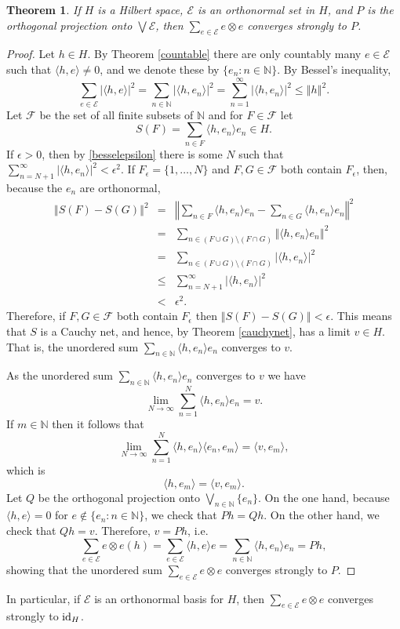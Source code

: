 \documentclass{article}
\newcommand{\inner}[2]{\langle #1, #2 \rangle}
\newcommand{\id}{\ensuremath\mathrm{id}}
\newcommand{\norm}[1]{\left\Vert #1 \right\Vert}
\newtheorem{theorem}{Theorem}
\begin{document}
\begin{theorem}
If $H$ is a Hilbert space, $\mathscr{E}$ is an orthonormal set in $H$, and $P$ is the orthogonal projection
onto $\bigvee \mathscr{E}$, then $\sum_{e \in \mathscr{E}} e \otimes e$ converges strongly to $P$.
\end{theorem}
\begin{proof}
Let $h \in H$. By Theorem \ref{countable} there are only countably many $e \in \mathscr{E}$ such that $\inner{h}{e} \neq 0$, and we denote
these by $\{e_n: n \in \mathbb{N}\}$. By Bessel's inequality,
\begin{equation}
\sum_{e \in \mathscr{E}} |\inner{h}{e}|^2 = \sum_{n \in \mathbb{N}} |\inner{h}{e_n}|^2 = \sum_{n=1}^\infty |\inner{h}{e_n}|^2 \leq 
\norm{h}^2.
\label{besselepsilon}
\end{equation}
Let $\mathscr{F}$ be the set of all finite subsets of $\mathbb{N}$ and for $F \in \mathscr{F}$ let
\[
S(F)=\sum_{n \in F} \inner{h}{e_n}e_n \in H.
\]
If $\epsilon>0$, then by \eqref{besselepsilon} there is some $N$ such that $\sum_{n=N+1}^\infty |\inner{h}{e_n}|^2<\epsilon^2$. If
$F_\epsilon=\{1,\ldots,N\}$ and $F,G \in \mathscr{F}$ both contain $F_\epsilon$, then, because the $e_n$ are orthonormal,
\begin{eqnarray*}
\norm{S(F)-S(G)}^2&=&\norm{\sum_{n \in F} \inner{h}{e_n}e_n - \sum_{n \in G} \inner{h}{e_n}e_n}^2\\
&=&\sum_{n \in (F \cup G) \setminus (F \cap G)} \norm{\inner{h}{e_n}e_n}^2\\
&=&\sum_{n \in (F \cup G) \setminus (F \cap G)} |\inner{h}{e_n}|^2\\
&\leq&\sum_{n=N+1}^\infty  |\inner{h}{e_n}|^2\\
&<&\epsilon^2.
\end{eqnarray*}
Therefore, if $F,G \in \mathscr{F}$ both contain $F_\epsilon$ then $\norm{S(F)-S(G)} < \epsilon$. This means that $S$ is a Cauchy net, and hence, by Theorem \ref{cauchynet},
has a limit $v \in H$. That is, the unordered sum $\sum_{n \in \mathbb{N}} \inner{h}{e_n}e_n$ converges to $v$.

As the unordered sum $\sum_{n \in \mathbb{N}} \inner{h}{e_n}e_n$ converges to $v$ we have
\[
\lim_{N \to \infty} \sum_{n=1}^N \inner{h}{e_n}e_n = v.
\]
If $m \in \mathbb{N}$ then it follows that 
\[
\lim_{N \to \infty} \sum_{n=1}^N \inner{h}{e_n}\inner{e_n}{e_m} = \inner{v}{e_m},
\]
which is
\[
\inner{h}{e_m}=\inner{v}{e_m}.
\]
Let
 $Q$ be the orthogonal projection onto $\bigvee_{n \in \mathbb{N}} \{e_n\}$. 
On the one hand, because $\inner{h}{e}=0$ for $e \not \in \{e_n:n \in \mathbb{N}\}$, we check that $Ph=Qh$. On the other hand, we check that $Qh=v$. Therefore, $v=Ph$, i.e.
\[
\sum_{e \in \mathscr{E}} e \otimes e(h)= \sum_{e \in \mathscr{E}} \inner{h}{e}e = \sum_{n \in \mathbb{N}} \inner{h}{e_n}e_n=Ph,
\]
showing that the unordered sum $\sum_{e \in \mathscr{E}} e \otimes e$ converges strongly to $P$.
 \end{proof}


In particular, if $\mathscr{E}$ is an orthonormal basis for $H$, then $\sum_{e \in \mathscr{E}} e \otimes e$ converges strongly
to $\id_H$.
\end{document}
